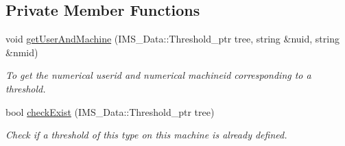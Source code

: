\subsection*{Private Member Functions}
\begin{DoxyCompactItemize}
\item 
void \hyperlink{classThresholdServer_a22403dda97498796a2aaa4c7d7763153}{getUserAndMachine} (IMS\_\-Data::Threshold\_\-ptr tree, string \&nuid, string \&nmid)
\begin{DoxyCompactList}\small\item\em To get the numerical userid and numerical machineid corresponding to a threshold. \item\end{DoxyCompactList}\item 
bool \hyperlink{classThresholdServer_af68236fde6dce7aab91703c0b544eb86}{checkExist} (IMS\_\-Data::Threshold\_\-ptr tree)
\begin{DoxyCompactList}\small\item\em Check if a threshold of this type on this machine is already defined. \item\end{DoxyCompactList}\end{DoxyCompactItemize}
